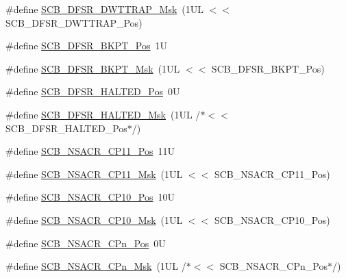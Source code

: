 \begin{DoxyCompactItemize}
\item 
\#define \mbox{\hyperlink{group___c_m_s_i_s___s_c_b_ga3f7384b8a761704655fd45396a305663}{S\+C\+B\+\_\+\+D\+F\+S\+R\+\_\+\+D\+W\+T\+T\+R\+A\+P\+\_\+\+Msk}}~(1\+U\+L $<$$<$ S\+C\+B\+\_\+\+D\+F\+S\+R\+\_\+\+D\+W\+T\+T\+R\+A\+P\+\_\+\+Pos)
\item 
\#define \mbox{\hyperlink{group___c_m_s_i_s___s_c_b_gaf28fdce48655f0dcefb383aebf26b050}{S\+C\+B\+\_\+\+D\+F\+S\+R\+\_\+\+B\+K\+P\+T\+\_\+\+Pos}}~1U
\item 
\#define \mbox{\hyperlink{group___c_m_s_i_s___s_c_b_ga609edf8f50bc49adb51ae28bcecefe1f}{S\+C\+B\+\_\+\+D\+F\+S\+R\+\_\+\+B\+K\+P\+T\+\_\+\+Msk}}~(1\+U\+L $<$$<$ S\+C\+B\+\_\+\+D\+F\+S\+R\+\_\+\+B\+K\+P\+T\+\_\+\+Pos)
\item 
\#define \mbox{\hyperlink{group___c_m_s_i_s___s_c_b_gaef4ec28427f9f88ac70a13ae4e541378}{S\+C\+B\+\_\+\+D\+F\+S\+R\+\_\+\+H\+A\+L\+T\+E\+D\+\_\+\+Pos}}~0U
\item 
\#define \mbox{\hyperlink{group___c_m_s_i_s___s_c_b_ga200bcf918d57443b5e29e8ce552e4bdf}{S\+C\+B\+\_\+\+D\+F\+S\+R\+\_\+\+H\+A\+L\+T\+E\+D\+\_\+\+Msk}}~(1\+U\+L /$\ast$$<$$<$ S\+C\+B\+\_\+\+D\+F\+S\+R\+\_\+\+H\+A\+L\+T\+E\+D\+\_\+\+Pos$\ast$/)
\item 
\#define \mbox{\hyperlink{group___c_m_s_i_s___s_c_b_gaa759ff8b4b16e6a7becf00b1a6005f65}{S\+C\+B\+\_\+\+N\+S\+A\+C\+R\+\_\+\+C\+P11\+\_\+\+Pos}}~11U
\item 
\#define \mbox{\hyperlink{group___c_m_s_i_s___s_c_b_gac025b32fd79c75b8d0ca578af1818241}{S\+C\+B\+\_\+\+N\+S\+A\+C\+R\+\_\+\+C\+P11\+\_\+\+Msk}}~(1\+U\+L $<$$<$ S\+C\+B\+\_\+\+N\+S\+A\+C\+R\+\_\+\+C\+P11\+\_\+\+Pos)
\item 
\#define \mbox{\hyperlink{group___c_m_s_i_s___s_c_b_gafb8add9ee956ce7e68254dd17631770c}{S\+C\+B\+\_\+\+N\+S\+A\+C\+R\+\_\+\+C\+P10\+\_\+\+Pos}}~10U
\item 
\#define \mbox{\hyperlink{group___c_m_s_i_s___s_c_b_ga3dc791e9d4bc647f3267dbb20bd531f7}{S\+C\+B\+\_\+\+N\+S\+A\+C\+R\+\_\+\+C\+P10\+\_\+\+Msk}}~(1\+U\+L $<$$<$ S\+C\+B\+\_\+\+N\+S\+A\+C\+R\+\_\+\+C\+P10\+\_\+\+Pos)
\item 
\#define \mbox{\hyperlink{group___c_m_s_i_s___s_c_b_ga48465bf3063f7673197c8c77ac5a591e}{S\+C\+B\+\_\+\+N\+S\+A\+C\+R\+\_\+\+C\+Pn\+\_\+\+Pos}}~0U
\item 
\#define \mbox{\hyperlink{group___c_m_s_i_s___s_c_b_gaf7bfd6e61300b561f4e0a3da8c7c4175}{S\+C\+B\+\_\+\+N\+S\+A\+C\+R\+\_\+\+C\+Pn\+\_\+\+Msk}}~(1\+U\+L /$\ast$$<$$<$ S\+C\+B\+\_\+\+N\+S\+A\+C\+R\+\_\+\+C\+Pn\+\_\+\+Pos$\ast$/)

\end{DoxyCompactItemize}
